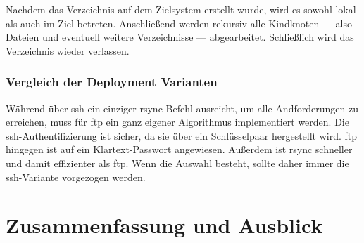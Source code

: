 Nachdem das Verzeichnis auf dem Zielsystem erstellt wurde, wird es sowohl lokal als auch im Ziel betreten. Anschließend werden rekursiv alle Kindknoten — also Dateien und eventuell weitere Verzeichnisse — abgearbeitet. Schließlich wird das Verzeichnis wieder verlassen.


\subsubsection{Vergleich der Deployment Varianten} %
\label{ssub:vergleich_der_deployment_varianten}

Während über \gls{ssh} ein einziger rsync-Befehl ausreicht, um alle Andforderungen zu erreichen, muss für \gls{ftp} ein ganz eigener Algorithmus implementiert werden. Die \gls{ssh}-Authentifizierung ist sicher, da sie über ein Schlüsselpaar hergestellt wird. \gls{ftp} hingegen ist auf ein Klartext-Passwort angewiesen. Außerdem ist rsync schneller und damit effizienter als \gls{ftp}. Wenn die Auswahl besteht, sollte daher immer die \gls{ssh}-Variante vorgezogen werden.




\section{Zusammenfassung und Ausblick} %
\label{sec:zusammenfassung_und_ausblick}
